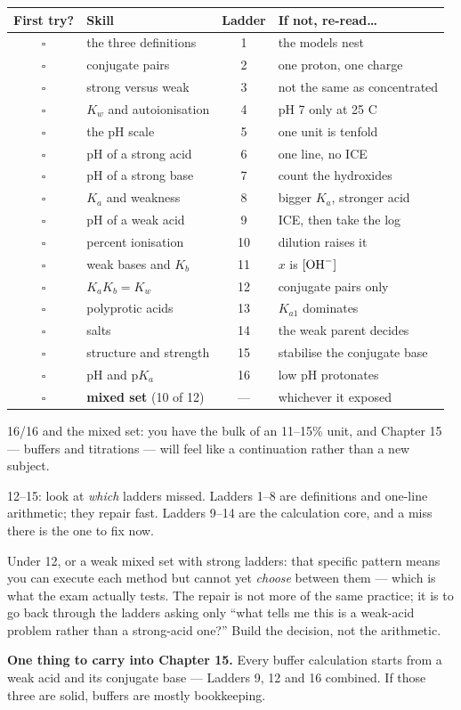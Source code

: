 \documentclass{apchem-worksheet}
\begin{document}
\renewcommand{\arraystretch}{1.25}
\noindent\begin{tabular}{@{}c p{5.7cm} c p{4.9cm}@{}}
\toprule
\textbf{First try?} & \textbf{Skill} & \textbf{Ladder} &
  \textbf{If not, re-read\ldots}\\
\midrule
$\square$ & the three definitions & 1 & the models nest \\
$\square$ & conjugate pairs & 2 & one proton, one charge \\
$\square$ & strong versus weak & 3 & not the same as concentrated \\
$\square$ & $K_{w}$ and autoionisation & 4 & pH 7 only at 25 C \\
$\square$ & the pH scale & 5 & one unit is tenfold \\
$\square$ & pH of a strong acid & 6 & one line, no ICE \\
$\square$ & pH of a strong base & 7 & count the hydroxides \\
$\square$ & $K_{a}$ and weakness & 8 & bigger $K_{a}$, stronger acid \\
$\square$ & pH of a weak acid & 9 & ICE, then take the log \\
$\square$ & percent ionisation & 10 & dilution raises it \\
$\square$ & weak bases and $K_{b}$ & 11 & $x$ is $[\ce{OH-}]$ \\
$\square$ & $K_{a}K_{b} = K_{w}$ & 12 & conjugate pairs only \\
$\square$ & polyprotic acids & 13 & $K_{a1}$ dominates \\
$\square$ & salts & 14 & the weak parent decides \\
$\square$ & structure and strength & 15 & stabilise the conjugate base \\
$\square$ & pH and p$K_{a}$ & 16 & low pH protonates \\
\midrule
$\square$ & \textbf{mixed set} (10 of 12) & --- & whichever it exposed \\
\bottomrule
\end{tabular}

\begin{apcnote}
16/16 and the mixed set: you have the bulk of an 11--15\% unit, and
Chapter 15 --- buffers and titrations --- will feel like a
continuation rather than a new subject.

12--15: look at \emph{which} ladders missed. Ladders 1--8 are
definitions and one-line arithmetic; they repair fast. Ladders 9--14 are
the calculation core, and a miss there is the one to fix now.

Under 12, or a weak mixed set with strong ladders: that specific
pattern means you can execute each method but cannot yet \emph{choose}
between them --- which is what the exam actually tests. The repair is
not more of the same practice; it is to go back through the ladders
asking only ``what tells me this is a weak-acid problem rather than a
strong-acid one?'' Build the decision, not the arithmetic.

\textbf{One thing to carry into Chapter 15.} Every buffer calculation
starts from a weak acid and its conjugate base --- Ladders 9, 12 and 16
combined. If those three are solid, buffers are mostly bookkeeping.
\end{apcnote}
\end{document}
